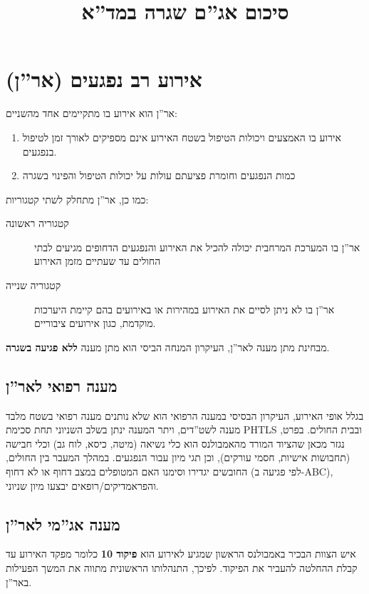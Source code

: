 \documentclass{article}
\title{סיכום אג''ם שגרה במד''א}
\date{}
\begin{document}
\maketitle
\section{אירוע רב נפגעים (אר''ן)}
אר''ן הוא אירוע בו מתקיימים אחד מהשניים:
\begin{enumerate}
    \item אירוע בו האמצעים ויכולות הטיפול בשטח האירוע אינם מספיקים לאורך זמן לטיפול בנפגעים.
    \item כמות הנפגעים וחומרת פציעתם עולות על יכולות הטיפול והפינוי בשגרה
\end{enumerate}
כמו כן, אר''ן מתחלק לשתי קטגוריות:
\begin{description}
    \item[קטגוריה ראשונה] אר''ן בו המערכת המרחבית יכולה להכיל את האירוע והנפגעים הדחופים מגיעים לבתי החולים עד שעתיים מזמן האירוע
    \item[קטגוריה שנייה] אר''ן בו לא ניתן לסיים את האירוע במהירות או באירועים בהם קיימת היערכות מוקדמת, כגון אירועים ציבוריים.
\end{description}
מבחינת מתן מענה לאר''ן, העיקרון המנחה הביסי הוא מתן מענה \textbf{ללא פגיעה בשגרה}.

\subsection{מענה רפואי לאר''ן}
בגלל אופי האירוע, העיקרון הבסיסי במענה הרפואי הוא שלא נותנים מענה רפואי בשטח מלבד מענה לשט''דים, ויתר המענה ינתן בשלב השניוני תחת סכימת \textenglish{PHTLS} ובבית החולים. בפרט, נגזר מכאן שהציוד המורד מהאמבולנס הוא כלי נשיאה (מיטה, כיסא, לוח גב) וכלי חבישה (תחבושות אישיות, חסמי עורקים), וכן תגי מיון עבור הנפגעים. במהלך המעבר בין החולים, החובשים יגדירו וסימנו האם המטופלים במצב דחוף או לא דחוף (לפי פגיעה ב-\textenglish{ABC}), והפראמדיקים/רופאים יבצעו מיון שניוני.
\subsection{מענה אג''מי לאר''ן}
איש הצוות הבכיר באמבולנס הראשון שמגיע לאירוע הוא \textbf{פיקוד 10} כלומר מפקד האירוע עד קבלת ההחלטה להעביר את הפיקוד. לפיכך, התנהלותו הראשונית מתווה את המשך הפעילות באר''ן.
\end{document}

